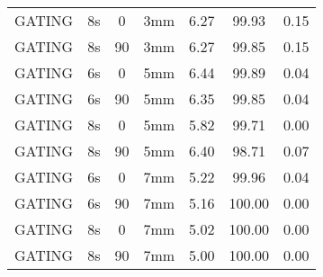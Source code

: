 \begin{table}[H]
\begin{tabular}{|c||c|c|c||c|c|c|}
GATING & 8s & 0 & 3mm & 6.27 & 99.93 & 0.15 \\
GATING & 8s & 90 & 3mm & 6.27 & 99.85 & 0.15 \\
GATING & 6s & 0 & 5mm & 6.44 & 99.89 & 0.04 \\
GATING & 6s & 90 & 5mm & 6.35 & 99.85 & 0.04 \\
GATING & 8s & 0 & 5mm & 5.82 & 99.71 & 0.00 \\
GATING & 8s & 90 & 5mm & 6.40 & 98.71 & 0.07 \\
GATING & 6s & 0 & 7mm & 5.22 & 99.96 & 0.04 \\
GATING & 6s & 90 & 7mm & 5.16 & 100.00 & 0.00 \\
GATING & 8s & 0 & 7mm & 5.02 & 100.00 & 0.00 \\
GATING & 8s & 90 & 7mm & 5.00 & 100.00 & 0.00 \\
    \hline\hline 
  \end{tabular}
\end{table}

\newpage

